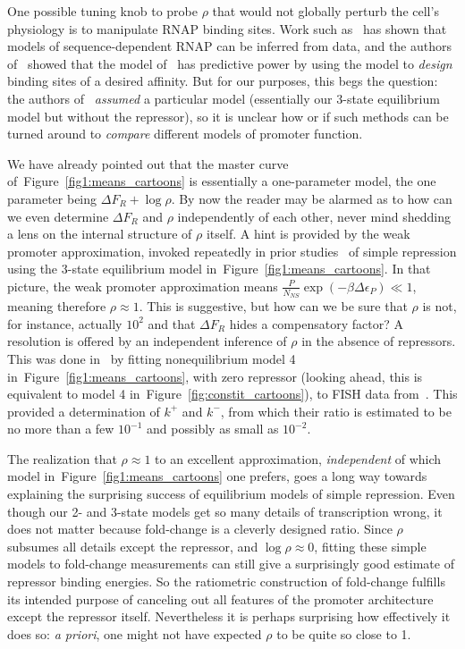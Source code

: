 \documentclass[12pt]{article}%
\newcommand{\fig}[1]{Figure~\ref{#1}}
\begin{document}
One possible tuning knob to probe $\rho$ that would not globally
perturb the cell's physiology is to manipulate RNAP binding sites.
Work such as~\cite{Kinney2010} has shown that models of
sequence-dependent RNAP can be inferred from data, and the
authors of~\cite{Brewster2012} showed that the model
of~\cite{Kinney2010} has predictive power by using the model to
\textit{design} binding sites of a desired affinity.
But for our purposes, this begs the question: the authors
of~\cite{Kinney2010} \textit{assumed} a particular model
(essentially our 3-state equilibrium model but without the
repressor), so it is unclear how or if such methods can be turned
around to \textit{compare} different models of promoter function.

We have already pointed out that the master curve
of~\fig{fig1:means_cartoons} is essentially a one-parameter model,
the one parameter being $\Delta F_R + \log\rho$.
By now the reader may be alarmed as to how can we even determine
$\Delta F_R$ and $\rho$ independently of each other, never mind
shedding a lens on the internal structure of $\rho$ itself.
A hint is provided by the weak promoter approximation, invoked
repeatedly in prior studies~\cite{Bintu2005c, Garcia2011a,
Razo-Mejia2018} of simple repression using the 3-state
equilibrium model in~\fig{fig1:means_cartoons}.
In that picture, the weak promoter approximation means
$\frac{P}{N_{NS}}\exp(-\beta\Delta\epsilon_P) \ll 1$,
meaning therefore $\rho\approx1$.
This is suggestive, but how can we be sure that $\rho$ is not,
for instance, actually $10^2$ and that $\Delta F_R$ hides a
compensatory factor?
A resolution is offered by an independent inference of $\rho$ in
the absence of repressors. This was done in~\cite{Razo-Mejia2020}
by fitting nonequilibrium model 4  in~\fig{fig1:means_cartoons},
with zero repressor (looking ahead, this is equivalent to model 4
in~\fig{fig:constit_cartoons}), to FISH data
from~\cite{Brewster2014}. This provided a determination of $k^+$
and $k^-$, from which their ratio is estimated to be no more than
a few $10^{-1}$ and possibly as small as $10^{-2}$.

The realization that $\rho\approx1$ to an excellent
approximation, \textit{independent} of which model
in~\fig{fig1:means_cartoons} one prefers, goes a long way towards
explaining the surprising success of equilibrium models of simple
repression. Even though our 2- and 3-state models get so many
details of transcription wrong, it does not matter because
fold-change is a cleverly designed ratio. Since $\rho$ subsumes
all details except the repressor, and $\log\rho\approx0$, fitting
these simple models to fold-change measurements can still give a
surprisingly good estimate of repressor binding energies. So the
ratiometric construction of fold-change fulfills its intended
purpose of canceling out all features of the promoter
architecture except the repressor itself. Nevertheless it is
perhaps surprising how effectively it does so: \textit{a priori},
one might not have expected $\rho$ to be quite so close to 1.
\end{document}
